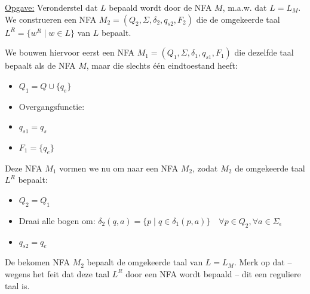 \documentclass[../aanvullingen_cursus.tex]{subfiles}
\begin{document}
\underline{Opgave:}
Veronderstel dat \(L\) bepaald wordt door de NFA \(M\), m.a.w. dat \(L=L_M\). We construeren een NFA \(M_2=(Q_2,\Sigma,\delta_2,q_{s2},F_2)\) die de omgekeerde taal \(L^R=\{w^R \mid w \in L\}\) van \(L\) bepaalt.

We bouwen hiervoor eerst een NFA \(M_1=(Q_1,\Sigma,\delta_1,q_{s1},F_1)\) die dezelfde taal bepaalt als de NFA \(M\), maar die slechts één eindtoestand heeft:
\begin{itemize}
	\item \( Q_1=Q\cup\{q_e\} \)
	\item Overgangsfunctie: 
	\item \(q_{s1}=q_s\)
	\item \( F_1=\{q_e\} \)
\end{itemize}

Deze NFA \(M_1\) vormen we nu om naar een NFA \(M_2\), zodat \(M_2\) de omgekeerde taal \(L^R\) bepaalt:
\begin{itemize}
	\item \( Q_2=Q_1 \)
	\item Draai alle bogen om: \(\delta_2(q,a)=\{p \mid q \in \delta_1(p,a)\} \quad \forall p \in Q_2, \forall a \in \Sigma_\epsilon\)
	\item \(q_{s2}=q_e\)
\end{itemize}

De bekomen NFA \(M_2\) bepaalt de omgekeerde taal van \(L=L_M\). Merk op dat -- wegens het feit dat deze taal \(L^R\) door een NFA wordt bepaald -- dit een reguliere taal is.
\end{document}
